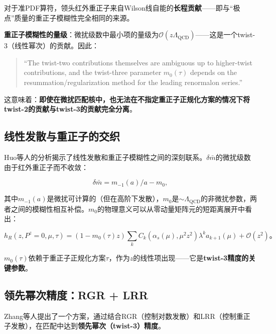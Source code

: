 \documentclass[12pt,a4paper]{ctexart}
\theoremstyle{definition}
\begin{document}
对于准PDF算符，领头红外重正子来自Wilson线自能的\textbf{长程贡献}——即与``极点''质量的重正子模糊性完全相同的来源\cite{Zhang2023RGR}。

\textbf{重正子模糊性的量级}\cite{Zhang2023RGR}：微扰级数中最小项的量级为$\mathcal{O}(z\Lambda_{\text{QCD}})$——这是一个twist-3（线性幂次）的贡献。因此：

\begin{quote}
``The twist-two contributions themselves are ambiguous up to higher-twist contributions, and the twist-three parameter $m_0(\tau)$ depends on the resummation/regularization method for the leading renormalon series.''\cite{Zhang2023RGR}
\end{quote}

这意味着：\textbf{即使在微扰匹配核中，也无法在不指定重正子正规化方案的情况下将twist-2的贡献与twist-3的贡献完全分离}。

\subsection{线性发散与重正子的交织}

Huo等人\cite{Huo2021self}的分析揭示了线性发散和重正子模糊性之间的深刻联系。$\delta \bar{m}$的微扰级数由于红外重正子而不收敛\cite{Huo2021self}：

\begin{equation}
\delta \bar{m} = m_{-1}(a)/a - m_0,
\label{eq:delta_m_renormalon}
\end{equation}

其中$m_{-1}(a)$是微扰可计算的（但在高阶下发散），$m_0$是$\sim \Lambda_{\text{QCD}}$的非微扰参数，两者之间的模糊性相互补偿。$m_0$的物理意义可以从零动量矩阵元的短距离展开中看出\cite{Zhang2023RGR}：

\begin{equation}
h_R(z, P^z=0, \mu, \tau) = (1 - m_0(\tau)z) \sum_k C_k(\alpha_s(\mu), \mu^2 z^2) \lambda^k a_{k+1}(\mu) + \mathcal{O}(z^2)。
\label{eq:short_distance_expansion}
\end{equation}

$m_0(\tau)$依赖于重正子正规化方案$\tau$，作为$z$的线性项出现——它是\textbf{twist-3精度的关键参数}。

\subsection{领先幂次精度：RGR + LRR}

Zhang等人\cite{Zhang2023RGR}提出了一个方案，通过结合RGR（控制对数发散）和LRR（控制重正子发散），在匹配中达到\textbf{领先幂次（twist-3）精度}。
\end{document}
